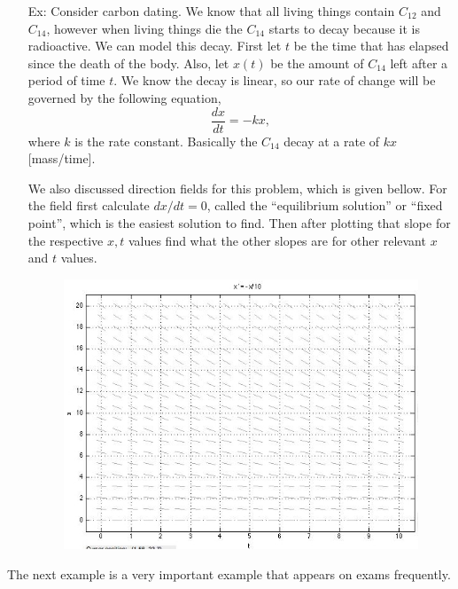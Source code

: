 \documentclass[reqno]{amsart}
\theoremstyle{definition}
\begin{document}
\begin{enumerate}

\item[Ex:  ] Consider carbon dating.  We know that all living things
contain $C_{12}$ and $C_{14}$, however when living things die
the $C_{14}$ starts to decay because it is radioactive.  We can model
this decay.  First let $t$ be the time that has elapsed since the death
of the body.  Also, let $x(t)$ be the amount of $C_{14}$ left after
a period of time $t$.  We know the decay is linear, so our rate of change
will be governed by the following equation,
%
\begin{equation*}
\frac{dx}{dt} = -kx,
\end{equation*}
%
where $k$ is the rate constant.  Basically the $C_{14}$ decay at a rate
of $kx$ [mass/time].

We also discussed direction fields for this problem, which is given bellow.
For the field first calculate $dx/dt = 0$, called the ``equilibrium solution''
or ``fixed point'', which is the easiest solution to
find.  Then after plotting that slope for the respective $x,t$ values find
what the other slopes are for other relevant $x$ and $t$ values.

\begin{figure}[htbp]
\includegraphics[scale=.42]{DF1.jpg}
\end{figure}

\end{enumerate}

The next example is a very important example that appears on exams frequently.
\end{document}

